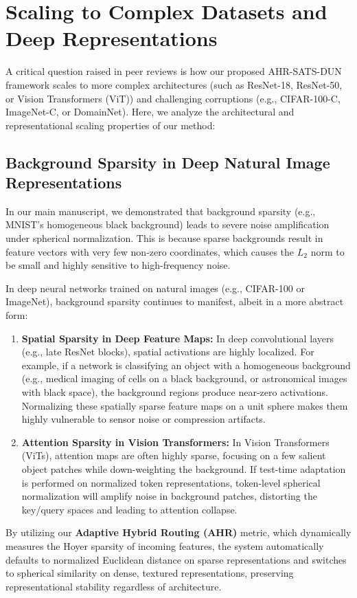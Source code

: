 \documentclass{article}
\theoremstyle{plain}
\theoremstyle{definition}
\theoremstyle{remark}
\begin{document}
\newpage
\appendix
\onecolumn

\section{Scaling to Complex Datasets and Deep Representations}
\label{app:scaling}

A critical question raised in peer reviews is how our proposed AHR-SATS-DUN framework scales to more complex architectures (such as ResNet-18, ResNet-50, or Vision Transformers (ViT)) and challenging corruptions (e.g., CIFAR-100-C, ImageNet-C, or DomainNet). Here, we analyze the architectural and representational scaling properties of our method:

\subsection{Background Sparsity in Deep Natural Image Representations}
In our main manuscript, we demonstrated that background sparsity (e.g., MNIST's homogeneous black background) leads to severe noise amplification under spherical normalization. This is because sparse backgrounds result in feature vectors with very few non-zero coordinates, which causes the $L_2$ norm to be small and highly sensitive to high-frequency noise.

In deep neural networks trained on natural images (e.g., CIFAR-100 or ImageNet), background sparsity continues to manifest, albeit in a more abstract form:
\begin{enumerate}
    \item \textbf{Spatial Sparsity in Deep Feature Maps:} In deep convolutional layers (e.g., late ResNet blocks), spatial activations are highly localized. For example, if a network is classifying an object with a homogeneous background (e.g., medical imaging of cells on a black background, or astronomical images with black space), the background regions produce near-zero activations. Normalizing these spatially sparse feature maps on a unit sphere makes them highly vulnerable to sensor noise or compression artifacts.
    \item \textbf{Attention Sparsity in Vision Transformers:} In Vision Transformers (ViTs), attention maps are often highly sparse, focusing on a few salient object patches while down-weighting the background. If test-time adaptation is performed on normalized token representations, token-level spherical normalization will amplify noise in background patches, distorting the key/query spaces and leading to attention collapse.
\end{enumerate}
By utilizing our \textbf{Adaptive Hybrid Routing (AHR)} metric, which dynamically measures the Hoyer sparsity of incoming features, the system automatically defaults to normalized Euclidean distance on sparse representations and switches to spherical similarity on dense, textured representations, preserving representational stability regardless of architecture.
\end{document}
